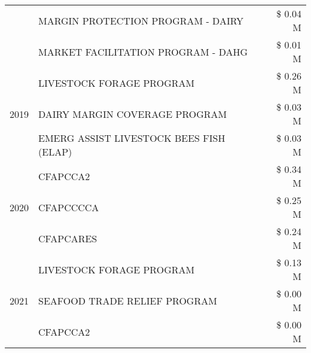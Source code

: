 \begin{tabular}{llr}
 & MARGIN PROTECTION PROGRAM - DAIRY & \$ 0.04 M \\
 & MARKET FACILITATION PROGRAM - DAHG & \$ 0.01 M \\
\cline{1-3}
\multirow[t]{3}{*}{2019} & LIVESTOCK FORAGE PROGRAM & \$ 0.26 M \\
 & DAIRY MARGIN COVERAGE PROGRAM & \$ 0.03 M \\
 & EMERG ASSIST LIVESTOCK BEES FISH (ELAP) & \$ 0.03 M \\
\cline{1-3}
\multirow[t]{3}{*}{2020} & CFAPCCA2 & \$ 0.34 M \\
 & CFAPCCCCA & \$ 0.25 M \\
 & CFAPCARES & \$ 0.24 M \\
\cline{1-3}
\multirow[t]{3}{*}{2021} & LIVESTOCK FORAGE PROGRAM & \$ 0.13 M \\
 & SEAFOOD TRADE RELIEF PROGRAM & \$ 0.00 M \\
 & CFAPCCA2 & \$ 0.00 M \\
\cline{1-3}
\bottomrule
\end{tabular}
